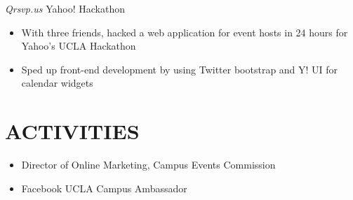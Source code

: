 \documentclass{res}
\begin{document}
\begin{resume}
 {\sl Qrsvp.us} \hfill Yahoo! Hackathon

  \begin{itemize} \itemsep -2pt
  \item  With three friends, hacked a web application for event hosts in 24 hours for Yahoo’s UCLA Hackathon
  \item Sped up front-end development by using Twitter bootstrap and Y! UI for calendar widgets
  \end{itemize} \vspace{-6pt}

\section{ACTIVITIES}
\vspace{0.25in}
  \begin{itemize} \itemsep -2pt
  \item Director of Online Marketing, Campus Events Commission
  \item Facebook UCLA Campus Ambassador
  \end{itemize}

\end{resume}
\end{document}
